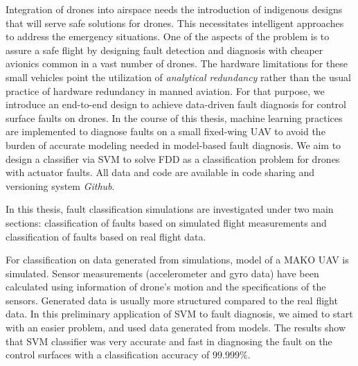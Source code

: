 Integration of drones into airspace needs the introduction of indigenous designs that will serve safe solutions for drones. This necessitates intelligent approaches to address the emergency situations. One of the aspects of the problem is to assure a safe flight by designing fault detection and diagnosis with cheaper avionics common in a vast number of drones.
The hardware limitations for these small vehicles point the utilization of \emph{analytical redundancy} rather than the usual practice of hardware redundancy in manned aviation. 
For that purpose, we introduce an end-to-end design to achieve data-driven fault diagnosis for control surface faults on drones.
In the course of this thesis, machine learning practices are implemented to diagnose faults on a small fixed-wing UAV to avoid the burden of accurate modeling needed in model-based fault diagnosis. 
We aim to design a classifier via SVM to solve FDD as a classification problem for drones with actuator faults.
All data and code are available in code sharing and versioning system \emph{Github}. 

In this thesis, fault classification simulations are investigated under two main sections: classification of faults based on simulated flight measurements and classification of faults based on real flight data. 

For classification on data generated from simulations, model of a MAKO UAV \cite{baskaya2017flight} is simulated.
Sensor measurements (accelerometer and gyro data) have been calculated using information of drone's motion and the specifications of the sensors. 
Generated data is usually more structured compared to the real flight data. 
In this preliminary application of SVM to fault diagnosis, we aimed to start with an easier problem, and used data generated from models.
The results show that SVM classifier was very accurate and fast in diagnosing the fault on the control surfaces with a classification accuracy of $99.999\%$.

